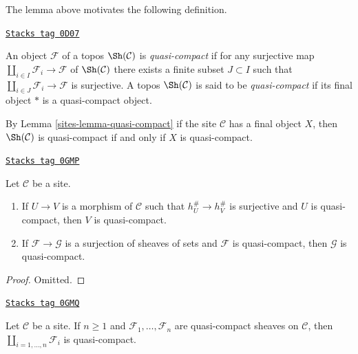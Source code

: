The lemma above motivates the following definition.

\begin{definition}
\label{sites-definition-quasi-compact-topos}
\href{https://stacks.math.columbia.edu/tag/0D07}{\texttt{Stacks tag 0D07}}

An object $\mathcal{F}$ of a topos $\Sh(\mathcal{C})$ is {\it quasi-compact}
if for any surjective map $\coprod_{i \in I} \mathcal{F}_i \to \mathcal{F}$
of $\Sh(\mathcal{C})$ there exists a finite subset $J \subset I$ such
that $\coprod_{i \in J} \mathcal{F}_i \to \mathcal{F}$ is surjective.
A topos $\Sh(\mathcal{C})$ is said to be {\it quasi-compact}
if its final object $*$ is a quasi-compact object.
\end{definition}

By Lemma \ref{sites-lemma-quasi-compact}
if the site $\mathcal{C}$ has a final object $X$, then
$\Sh(\mathcal{C})$ is quasi-compact if and only if $X$ is quasi-compact.

\begin{lemma}
\label{sites-lemma-image-of-quasi-compact}
\href{https://stacks.math.columbia.edu/tag/0GMP}{\texttt{Stacks tag 0GMP}}


Let $\mathcal{C}$ be a site.
\begin{enumerate}
\item If $U \to V$ is a morphism of $\mathcal{C}$ such that
$h_U^\# \to h_V^\#$ is surjective and $U$ is quasi-compact, then
$V$ is quasi-compact.
\item If $\mathcal{F} \to \mathcal{G}$ is a surjection of sheaves
of sets and $\mathcal{F}$ is quasi-compact, then $\mathcal{G}$
is quasi-compact.
\end{enumerate}
\end{lemma}

\begin{proof}
Omitted.
\end{proof}

\begin{lemma}
\label{sites-lemma-coproduct-quasi-compact}
\href{https://stacks.math.columbia.edu/tag/0GMQ}{\texttt{Stacks tag 0GMQ}}


Let $\mathcal{C}$ be a site. If $n \geq 1$ and
$\mathcal{F}_1, \ldots, \mathcal{F}_n$ are quasi-compact
sheaves on $\mathcal{C}$, then $\coprod_{i = 1, \ldots, n} \mathcal{F}_i$
is quasi-compact.
\end{lemma}


